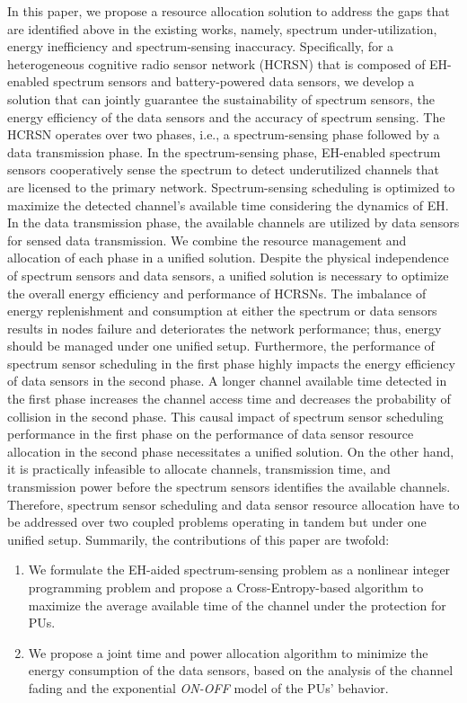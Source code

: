 \documentclass[journal]{IEEEtran} \ifCLASSINFOpdf
\begin{document}
In this paper, we propose a resource allocation solution to address the gaps that are identified above in the existing works, namely, spectrum under-utilization, energy inefficiency and spectrum-sensing inaccuracy. Specifically, for a heterogeneous cognitive radio sensor network (HCRSN) that is composed of EH-enabled spectrum sensors and battery-powered data sensors, we develop a solution that can jointly guarantee the sustainability of spectrum sensors, the energy efficiency of the data sensors and the accuracy of spectrum sensing. The HCRSN operates over two phases, i.e., a spectrum-sensing phase followed by a data transmission phase. In the spectrum-sensing phase, EH-enabled spectrum sensors cooperatively sense the spectrum to detect underutilized channels that are licensed to the primary network. Spectrum-sensing scheduling is optimized to maximize the detected channel's available time considering the dynamics of EH. In the data transmission phase, the available channels are utilized by data sensors for sensed data transmission. We combine the resource management and allocation of each phase in a unified solution. Despite the physical independence of spectrum sensors and data sensors, a unified solution is necessary to optimize the overall energy efficiency and performance of HCRSNs. The imbalance of energy replenishment and consumption at either the spectrum or data sensors results in nodes failure and deteriorates the network performance; thus, energy should be managed under one unified setup. Furthermore, the performance of spectrum sensor scheduling in the first phase highly impacts the energy efficiency of data sensors in the second phase. A longer channel available time detected in the first phase increases the channel access time and decreases the probability of collision in the second phase. This causal impact of spectrum sensor scheduling performance in the first phase on the performance of data sensor resource allocation in the second phase necessitates a unified solution. On the other hand, it is practically infeasible to allocate channels, transmission time, and transmission power before the spectrum sensors identifies the available channels. Therefore, spectrum sensor scheduling and data sensor resource allocation have to be addressed over two coupled problems operating in tandem but under one unified setup. Summarily, the contributions of this paper are twofold:
\begin{enumerate}
\item We formulate the EH-aided spectrum-sensing problem as a nonlinear integer programming problem and propose a Cross-Entropy-based algorithm to maximize the average available time of the channel under the protection for PUs.
\item We propose a joint time and power allocation algorithm to minimize the energy consumption of the data sensors, based on the analysis of the channel fading and the exponential \textit{ON-OFF} model of the PUs' behavior.
\end{enumerate}
\end{document}
